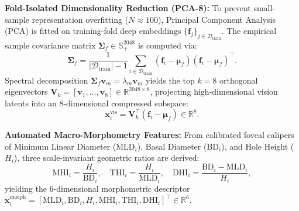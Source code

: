 \documentclass[preprint,12pt]{elsarticle}
\begin{document}
\noindent\textbf{Fold-Isolated Dimensionality Reduction (PCA-8):} To prevent small-sample representation overfitting ($N \approx 100$), Principal Component Analysis (PCA) is fitted on training-fold deep embeddings $\{\mathbf{f}_j\}_{j \in \mathcal{D}_{\text{train}}}$. The empirical sample covariance matrix $\mathbf{\Sigma}_f \in \mathbb{S}_{+}^{2048}$ is computed via:
\begin{equation}
\mathbf{\Sigma}_f = \frac{1}{|\mathcal{D}_{\text{train}}| - 1} \sum_{i \in \mathcal{D}_{\text{train}}} (\mathbf{f}_i - \bm{\mu}_f)(\mathbf{f}_i - \bm{\mu}_f)^{\top}.
\end{equation}
Spectral decomposition $\mathbf{\Sigma}_f \mathbf{v}_m = \lambda_m \mathbf{v}_m$ yields the top $k=8$ orthogonal eigenvectors $\mathbf{V}_k = [\mathbf{v}_1, \dots, \mathbf{v}_8] \in \mathbb{R}^{2048 \times 8}$, projecting high-dimensional vision latents into an 8-dimensional compressed subspace:
\begin{equation}
\mathbf{x}_i^{\text{vis}} = \mathbf{V}_k^{\top} \left( \mathbf{f}_i - \bm{\mu}_f \right) \in \mathbb{R}^8.
\end{equation}

\noindent\textbf{Automated Macro-Morphometry Features:} From calibrated foveal calipers of Minimum Linear Diameter ($\text{MLD}_i$), Basal Diameter ($\text{BD}_i$), and Hole Height ($H_i$), three scale-invariant geometric ratios are derived:
\begin{equation}
\text{MHI}_i = \frac{H_i}{\text{BD}_i}, \quad \text{THI}_i = \frac{H_i}{\text{MLD}_i}, \quad \text{DHI}_i = \frac{\text{BD}_i - \text{MLD}_i}{H_i},
\end{equation}
yielding the 6-dimensional morphometric descriptor $\mathbf{x}_i^{\text{morph}} = [\text{MLD}_i, \text{BD}_i, H_i, \text{MHI}_i, \text{THI}_i, \text{DHI}_i]^{\top} \in \mathbb{R}^6$.
\end{document}
